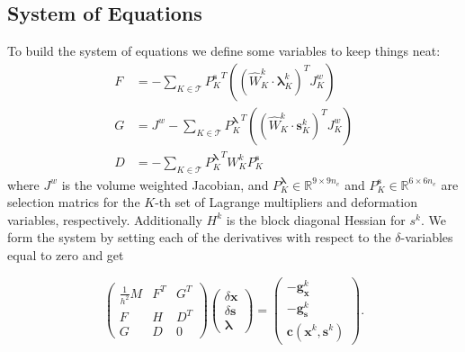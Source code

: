 \documentclass[letterpaper,12pt]{article}
\theoremstyle{remark}
\newcommand{\R}{\mathbb{R}}
\newcommand{\Th}{\mathcal{T}}
\newcommand{\x}{\mathbf{x}}
\newcommand{\C}{\mathbf{c}}
\newcommand{\s}{\mathbf{s}}
\newcommand{\la}{\mathbf{\lambda}}
\newcommand{\dx}{\delta \x}
\newcommand{\ds}{\delta \s}
\newcommand{\gx}{ {\mathbf{g}_\x^k} }
\newcommand{\gs}{ {\mathbf{g}_\s^k} }
\begin{document}
\subsection{System of Equations}
To build the system of equations we define some variables to keep things neat:
\begin{align}
F &= - \sum_{K \in \Th} {P_K^\s}^T \left((\hat{W}_K^{k}\cdot \la_K^k)^T J_K^w \right) \\
G &= J^w - \sum_{K \in \Th} {P_K^\la}^T \left((\hat{W}_K^{k}\cdot \s_K^k)^T J_K^w \right) \\
D &= -\sum_{K \in \Th} {P_K^\la}^T  W_K^k P_K^\s
\end{align}
where $J^w$ is the volume weighted Jacobian, and $P_K^\la \in \R^{9 \times 9n_e}$ and $P_K^\s \in \R^{6 \times 6n_e}$ are selection matrics for the $K$-th set of Lagrange multipliers and deformation variables, respectively. Additionally $H^k$ is the block diagonal Hessian for $s^k$. We form the system by setting each of the derivatives with respect to the $\delta$-variables equal to zero and get

\begin{equation}
\begin{pmatrix}
\frac{1}{h^2}M & F^T & G^T \\
F & H & D^T\\
G & D & 0
\end{pmatrix}
\begin{pmatrix}
\dx \\
\ds \\
\la
\end{pmatrix} =
\begin{pmatrix}
-\gx \\
-\gs \\
\C (\x^k, \s^k)
\end{pmatrix}.
\end{equation}
\end{document}

